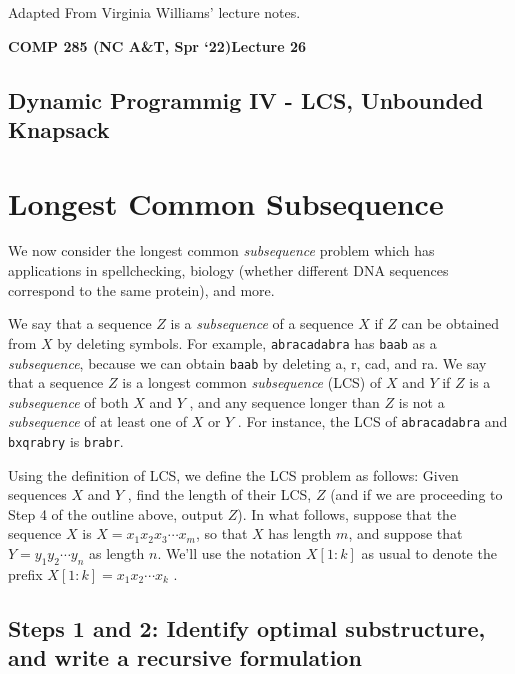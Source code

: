 \documentclass [12pt]{article}
\theoremstyle{definition}
\begin{document}
 

\vspace {1em} 
\begin {Instruction} 
Adapted From Virginia Williams' lecture notes.
\end {Instruction}  

{\LARGE \textbf {COMP 285 (NC A\&T, Spr `22)}\hfill \textbf {Lecture 26} } 

\begin{centering}
\section*{Dynamic Programmig IV - LCS, Unbounded Knapsack}
\end{centering}


\section{Longest Common Subsequence}
We now consider the longest common \textit{subsequence} problem which has applications in spellchecking, biology (whether different DNA sequences correspond to the same protein), and more. 

We say that a sequence $Z$ is a \textit{subsequence} of a sequence $X$ if $Z$ can be obtained from $X$ by deleting symbols. For example, \texttt{abracadabra} has \texttt{baab} as a \textit{subsequence}, because we can obtain \texttt{baab} by deleting a, r, cad, and ra. We say that a sequence $Z$ is a longest common \textit{subsequence} (LCS) of $X$ and $Y$ if $Z$ is a \textit{subsequence} of both $X$ and $Y$ , and any sequence longer than $Z$ is not a \textit{subsequence} of at least one of $X$ or $Y$ . For instance, the LCS of \texttt{abracadabra} and \texttt{bxqrabry} is \texttt{brabr}. 

Using the definition of LCS, we define the LCS problem as follows: Given sequences $X$ and $Y$ , find the length of their LCS, $Z$ (and if we are proceeding to Step 4 of the outline above, output $Z$). In what follows, suppose that the sequence $X$ is $X = x_1x_2x_3 \cdots x_m$, so that $X$ has length $m$, and suppose that $Y = y_1y_2 \cdots y_n$ as length $n$. We'll use the notation $X[1 : k]$ as usual to denote the prefix $X[1 : k] = x_1x_2 \cdots x_k$ .

\subsection{Steps 1 and 2: Identify optimal substructure, and write a recursive
formulation}
\end{document}
